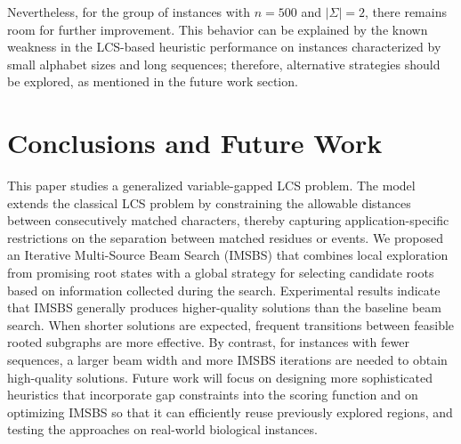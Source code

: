 \documentclass[runningheads]{llncs}
\begin{document}
	Nevertheless, for the group of instances with $n=500$ and $|\Sigma|=2$, there remains room for further improvement. This behavior can be explained by the known weakness in the LCS-based heuristic performance on instances characterized by small alphabet sizes and long sequences; therefore, alternative strategies should be explored, as mentioned in the future work section.
	
	
	
	
	\section{Conclusions and Future Work}
	\label{sec: conclusions}
	
	This paper studies a generalized variable-gapped LCS problem. The model extends the classical LCS problem by constraining the allowable distances between consecutively matched characters, thereby capturing application-specific restrictions on the separation between matched residues or events.  
	We proposed an Iterative Multi-Source Beam Search (IMSBS) that combines local exploration from promising root states with a global strategy for selecting candidate roots based on information collected during the search. Experimental results indicate that IMSBS generally produces higher-quality solutions than the baseline beam search. When shorter solutions are expected, frequent transitions between feasible rooted subgraphs are more effective. By contrast, for instances with fewer sequences, a larger beam width and more IMSBS iterations are needed to obtain high-quality solutions.  %
	Future work will focus on designing more sophisticated heuristics that incorporate gap constraints into the scoring function and on optimizing IMSBS so that it can efficiently reuse previously explored regions, %
	and testing the approaches on real-world biological instances. %
	\\
	
\end{document}
